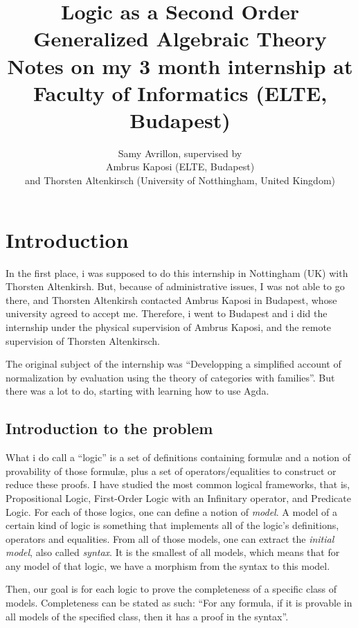\documentclass[10pt,a4paper]{article}
\title{Logic as a Second Order Generalized Algebraic Theory
	\\[1ex] \large Notes on my 3 month internship at Faculty of Informatics (ELTE, Budapest)}
\author{Samy Avrillon, supervised by
	\\[1ex] Ambrus Kaposi (ELTE, Budapest)
	\\[1ex] and Thorsten Altenkirsch (University of Notthingham, United Kingdom)}
\begin{document}
	\doparttoc
	\maketitle
	
	\hsep
	
	\tableofcontents
	
	\newpage
	
	
	\section{Introduction}
	
		In the first place, i was supposed to do this internship in Nottingham (UK) with Thorsten Altenkirsh. But, because of administrative issues, I was not able to go there, and Thorsten Altenkirsh contacted Ambrus Kaposi in Budapest, whose university agreed to accept me. Therefore, i went to Budapest and i did the internship under the physical supervision of Ambrus Kaposi, and the remote supervision of Thorsten Altenkirsch.
		
		The original subject of the internship was \enquote{Developping a simplified account of normalization by evaluation using the theory of categories with families}. But there was a lot to do, starting with learning how to use Agda.
		
		\subsection{Introduction to the problem}
			What i do call a \enquote{logic} is a set of definitions containing formulæ and a notion of provability of those formulæ, plus a set of operators/equalities to construct or reduce these proofs. I have studied the most common logical frameworks, that is, Propositional Logic, First-Order Logic with an Infinitary operator, and Predicate Logic. For each of those logics, one can define a notion of \emph{model}. A model of a certain kind of logic is something that implements all of the logic's definitions, operators and equalities. From all of those models, one can extract the \emph{initial model}, also called \emph{syntax}. It is the smallest of all models, which means that for any model of that logic, we have a morphism from the syntax to this model.
			
			Then, our goal is for each logic to prove the completeness of a specific class of models. Completeness can be stated as such: \enquote{For any formula, if it is provable in all models of the specified class, then it has a proof in the syntax}.
			
\end{document}
